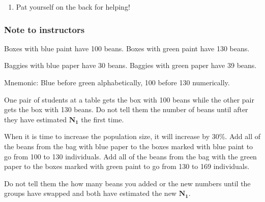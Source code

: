 \documentclass[12pt, hidelinks]{exam}
\newlength{\basespace}
\begin{document}
\begin{questions}
\begin{enumerate}
	\item Pat yourself on the back for helping!
	
\end{enumerate}
%
%
%
%

\end{questions}

\newpage

\ifprintanswers \bfseries

\subsubsection*{Note to instructors}

Boxes with blue paint have 100 beans. Boxes with green paint have 130 beans.

Baggies with blue paper have 30 beans. Baggies with green paper have 39 beans. 

Mnemonic: Blue before green alphabetically, 100 before 130 numerically.




One pair of students at a table gets the box with 100 beans while the other pair gets the box with 130 beans. Do not tell them the number of beans until after they have estimated $\symbf{N_1}$ the first time.


When it is time to increase the population size, it will increase by 30\%.  Add all of the beans from the bag with blue paper to the boxes marked with blue paint to go from 100 to 130 individuals. Add all of the beans from the bag with the green paper to the boxes marked with green paint to go from 130 to 169 individuals.

Do not tell them the how many beans you added or the new numbers until the groups have swapped and both have estimated the new $\symbf{N_1}$.

\fi	
\end{document}
